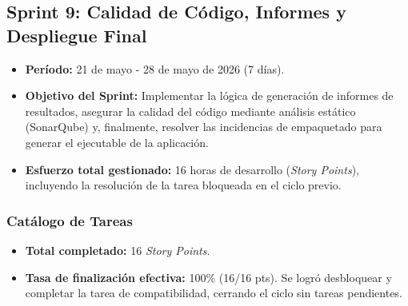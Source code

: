 \subsection{Sprint 9: Calidad de Código, Informes y Despliegue Final}

\begin{itemize}
    \item \textbf{Período:} 21 de mayo - 28 de mayo de 2026 (7 días).
    \item \textbf{Objetivo del Sprint:} Implementar la lógica de generación de informes de resultados, asegurar la calidad del código mediante análisis estático (SonarQube) y, finalmente, resolver las incidencias de empaquetado para generar el ejecutable de la aplicación.
    \item \textbf{Esfuerzo total gestionado:} 16 horas de desarrollo (\textit{Story Points}), incluyendo la resolución de la tarea bloqueada en el ciclo previo.
\end{itemize}

\subsubsection{Catálogo de Tareas}

\begin{table}[H]
    \centering
    \caption{Catálogo de tareas del Sprint 9.}
\end{table}

\begin{itemize}
    \item \textbf{Total completado:} 16 \textit{Story Points}.
    \item \textbf{Tasa de finalización efectiva:} 100\% (16/16 pts). Se logró desbloquear y completar la tarea de compatibilidad, cerrando el ciclo sin tareas pendientes.
\end{itemize}

